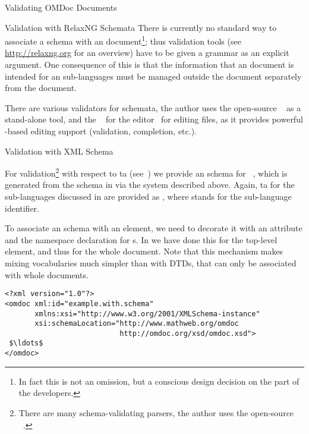 \begin{tchapter}[id=validating]{Validating OMDoc Documents}
\begin{tsection}[id=validate-rnc]{Validation with RelaxNG Schemata}
  There is currently no standard way to associate a {\relaxng} schema with an {\xml}
  document\footnote{In fact this is not an omission, but a conscious design decision on
    the part of the {\relaxng} developers.}; thus validation tools (see
  \url{http://relaxng.org} for an overview) have to be given a grammar as an explicit
  argument. One consequence of this is that the information that an {\omdoc} document is
  intended for an {\omdoc} sub-languages must be managed outside the document separately
  from the document.

  There are various validators for {\relaxng} schemata, the author uses the open-source
  {}~\cite{Veillard:libxml2} as a stand-alone tool, and the
  {}~\cite{nxml-mode:URL} for the {\emacs} editor~\cite{Stallman:em02}
  for editing {\xml} files, as it provides powerful {\relaxng}-based editing support
  (validation, completion, etc.).
\end{tsection}

\begin{tsection}[id=xsd:validation]{Validation with XML Schema}
  
  For validation\footnote{There are many schema-validating {\xml}
    parsers, the author uses the open-source
    {}~\cite{Veillard:libxml2}.} with respect to {\xml}
  {ta} (see~\cite{XML:Schema}) we provide an {\xml} schema for
  {\omdoc}~\cite{OMDocXSD:URL}, which is generated from the {\relaxng} schema in
  {} via the {} system described above. Again,
  {ta} for the sub-languages discussed in {} are
  provided as {}, where {}
  stands for the sub-language identifier.

  To associate an {\xml} schema with an element, we need to decorate it with an
  {} attribute and the namespace declaration
  for {\xml} {s}. In {} we have done this
  for the top-level {} element, and thus for the whole document. Note that
  this mechanism makes mixing {\xml} vocabularies much simpler than with DTDs, that can
  only be associated with whole documents.

\begin{lstlisting}[label=lst:xml-schema,mathescape,
  caption={An \protect{\xml} document with an {\xml} Schema.},
  index={omdoc,xmlns,xsi,schemaLocation}]
<?xml version="1.0"?>
<omdoc xml:id="example.with.schema"
       xmlns:xsi="http://www.w3.org/2001/XMLSchema-instance" 
       xsi:schemaLocation="http://www.mathweb.org/omdoc
                           http://omdoc.org/xsd/omdoc.xsd">
 $\ldots$
</omdoc>
\end{lstlisting}
\end{tsection}

\end{tchapter}

